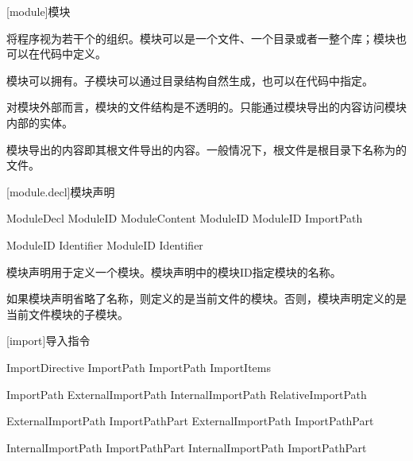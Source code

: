 
[module]{模块}

\pnum
\X{}将程序视为若干个的组织。模块可以是一个文件、一个目录或者一整个库；模块也可以在代码中定义。

\pnum
模块可以拥有。子模块可以通过目录结构自然生成，也可以在代码中指定。

\pnum
对模块外部而言，模块的文件结构是不透明的。只能通过模块导出的内容访问模块内部的实体。

\pnum
模块导出的内容即其根文件导出的内容。一般情况下，根文件是根目录下名称为的文件。

[module.decl]{模块声明}

\begin{bnf}{ModuleDecl}
     ModuleID\bnfq \terminal{\{} ModuleContent \terminal{\}} \br
     ModuleID\bnfq \terminal{;} \br
     ModuleID\bnfq \terminal{=} ImportPath \terminal{;}
\end{bnf}

\begin{bnf}{ModuleID}
    Identifier \br
    ModuleID  Identifier
\end{bnf}

\pnum
模块声明用于定义一个模块。模块声明中的模块ID指定模块的名称。

\pnum
如果模块声明省略了名称，则定义的是当前文件的模块。否则，模块声明定义的是当前文件模块的子模块。

[import]{导入指令}

\begin{bnf}{ImportDirective}
    \bnfq {} ImportPath \terminal{;} \br
    \bnfq {} ImportPath \terminal{:} ImportItems \terminal{;}
\end{bnf}

\begin{bnf}{ImportPath}
    ExternalImportPath \br
    InternalImportPath \br
    RelativeImportPath
\end{bnf}

\begin{bnf}{ExternalImportPath}
    ImportPathPart \br
    ExternalImportPath  ImportPathPart
\end{bnf}

\begin{bnf}{InternalImportPath}
      ImportPathPart \br
    InternalImportPath  ImportPathPart
\end{bnf}

